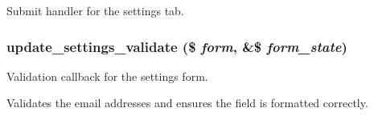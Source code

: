 Submit handler for the settings tab. \hypertarget{update_8settings_8inc_1dc52dbb9606fca692a9fb3f8127da01}{
\subsubsection[{update\_\-settings\_\-validate}]{\setlength{\rightskip}{0pt plus 5cm}update\_\-settings\_\-validate (\$ {\em form}, \/  \&\$ {\em form\_\-state})}}
\label{update_8settings_8inc_1dc52dbb9606fca692a9fb3f8127da01}


Validation callback for the settings form.

Validates the email addresses and ensures the field is formatted correctly. 
